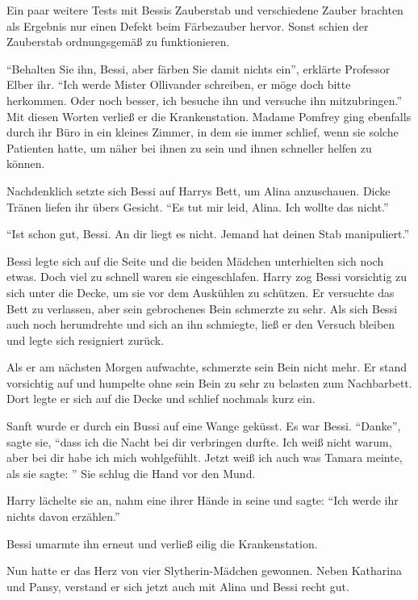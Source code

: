 Ein paar weitere Tests mit Bessis Zauberstab und verschiedene Zauber brachten als Ergebnis nur einen Defekt beim Färbezauber hervor. Sonst schien der Zauberstab ordnungsgemäß zu funktionieren.

\enquote{Behalten Sie ihn, Bessi, aber färben Sie damit nichts ein}, erklärte Professor Elber ihr. \enquote{Ich werde Mister Ollivander schreiben, er möge doch bitte herkommen. Oder noch besser, ich besuche ihn und versuche ihn mitzubringen.} Mit diesen Worten verließ er die Krankenstation. Madame Pomfrey ging ebenfalls durch ihr Büro in ein kleines Zimmer, in dem sie immer schlief, wenn sie solche Patienten hatte, um näher bei ihnen zu sein und ihnen schneller helfen zu können.

Nachdenklich setzte sich Bessi auf Harrys Bett, um Alina anzuschauen. Dicke Tränen liefen ihr übers Gesicht. \enquote{Es tut mir leid, Alina. Ich wollte das nicht.}

\enquote{Ist schon gut, Bessi. An dir liegt es nicht. Jemand hat deinen Stab manipuliert.}

Bessi legte sich auf die Seite und die beiden Mädchen unterhielten sich noch etwas. Doch viel zu schnell waren sie eingeschlafen. Harry zog Bessi vorsichtig zu sich unter die Decke, um sie vor dem Auskühlen zu schützen. Er versuchte das Bett zu verlassen, aber sein gebrochenes Bein schmerzte zu sehr. Als sich Bessi auch noch herumdrehte und sich an ihn schmiegte, ließ er den Versuch bleiben und legte sich resigniert zurück.

Als er am nächsten Morgen aufwachte, schmerzte sein Bein nicht mehr. Er stand vorsichtig auf und humpelte \gst ohne sein Bein zu sehr zu belasten \gst zum Nachbarbett. Dort legte er sich auf die Decke und schlief nochmals kurz ein.

Sanft wurde er durch ein Bussi auf eine Wange geküsst. Es war Bessi. \enquote{Danke}, sagte sie, \enquote{dass ich die Nacht bei dir verbringen durfte. Ich weiß nicht warum, aber bei dir habe ich mich wohlgefühlt. Jetzt weiß ich auch was Tamara meinte, als sie sagte: } Sie schlug die Hand vor den Mund.

Harry lächelte sie an, nahm eine ihrer Hände in seine und sagte: \enquote{Ich werde ihr nichts davon erzählen.}

Bessi umarmte ihn erneut und verließ eilig die Krankenstation.

Nun hatte er das Herz von vier Slytherin-Mädchen gewonnen. Neben Katharina und Pansy, verstand er sich jetzt auch mit Alina und Bessi recht gut.

